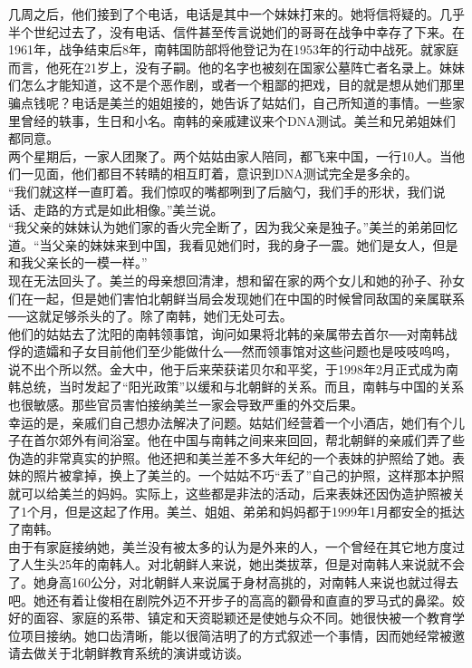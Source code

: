 几周之后，他们接到了个电话，电话是其中一个妹妹打来的。她将信将疑的。几乎半个世纪过去了，没有电话、信件甚至传言说她们的哥哥在战争中幸存了下来。在1961年，战争结束后8年，南韩国防部将他登记为在1953年的行动中战死。就家庭而言，他死在21岁上，没有子嗣。他的名字也被刻在国家公墓阵亡者名录上。妹妹们怎么才能知道，这不是个恶作剧，或者一个粗鄙的把戏，目的就是想从她们那里骗点钱呢？电话是美兰的姐姐接的，她告诉了姑姑们，自己所知道的事情。一些家里曾经的轶事，生日和小名。南韩的亲戚建议来个DNA测试。美兰和兄弟姐妹们都同意。\\

两个星期后，一家人团聚了。两个姑姑由家人陪同，都飞来中国，一行10人。当他们一见面，他们都目不转睛的相互盯着，意识到DNA测试完全是多余的。\\

“我们就这样一直盯着。我们惊叹的嘴都咧到了后脑勺，我们手的形状，我们说话、走路的方式是如此相像。”美兰说。\\

“我父亲的妹妹认为她们家的香火完全断了，因为我父亲是独子。”美兰的弟弟回忆道。“当父亲的妹妹来到中国，我看见她们时，我的身子一震。她们是女人，但是和我父亲长的一模一样。”\\

现在无法回头了。美兰的母亲想回清津，想和留在家的两个女儿和她的孙子、孙女们在一起，但是她们害怕北朝鲜当局会发现她们在中国的时候曾同敌国的亲属联系──这就足够杀头的了。除了南韩，她们无处可去。\\

他们的姑姑去了沈阳的南韩领事馆，询问如果将北韩的亲属带去首尔──对南韩战俘的遗孀和子女目前他们至少能做什么──然而领事馆对这些问题也是吱吱呜呜，说不出个所以然。金大中，他于后来荣获诺贝尔和平奖，于1998年2月正式成为南韩总统，当时发起了“阳光政策”以缓和与北朝鲜的关系。而且，南韩与中国的关系也很敏感。那些官员害怕接纳美兰一家会导致严重的外交后果。\\

幸运的是，亲戚们自己想办法解决了问题。姑姑们经营着一个小酒店，她们有个儿子在首尔郊外有间浴室。他在中国与南韩之间来来回回，帮北朝鲜的亲戚们弄了些伪造的非常真实的护照。他还把和美兰差不多大年纪的一个表妹的护照给了她。表妹的照片被拿掉，换上了美兰的。一个姑姑不巧“丢了”自己的护照，这样那本护照就可以给美兰的妈妈。实际上，这些都是非法的活动，后来表妹还因伪造护照被关了1个月，但是这起了作用。美兰、姐姐、弟弟和妈妈都于1999年1月都安全的抵达了南韩。\\

由于有家庭接纳她，美兰没有被太多的认为是外来的人，一个曾经在其它地方度过了人生头25年的南韩人。对北朝鲜人来说，她出类拔萃，但是对南韩人来说就不会了。她身高160公分，对北朝鲜人来说属于身材高挑的，对南韩人来说也就过得去吧。她还有着让俊相在剧院外迈不开步子的高高的颧骨和直直的罗马式的鼻梁。姣好的面容、家庭的系带、镇定和天资聪颖还是使她与众不同。她很快被一个教育学位项目接纳。她口齿清晰，能以很简洁明了的方式叙述一个事情，因而她经常被邀请去做关于北朝鲜教育系统的演讲或访谈。\\

